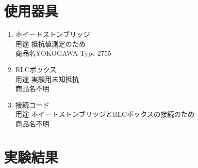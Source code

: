 \documentclass[titlepage]{jarticle}
\begin{document}
\section{使用器具}
\begin{enumerate}
    \item ホイートストンブリッジ\\用途 抵抗値測定のため\\商品名YOKOGAWA Type 2755
    \item RLCボックス\\用途 実験用未知抵抗\\商品名不明
    \item 接続コード\\用途 ホイートストンブリッジとRLCボックスの接続のため\\商品名不明
\end{enumerate}

\section{実験結果}
\end{document}
